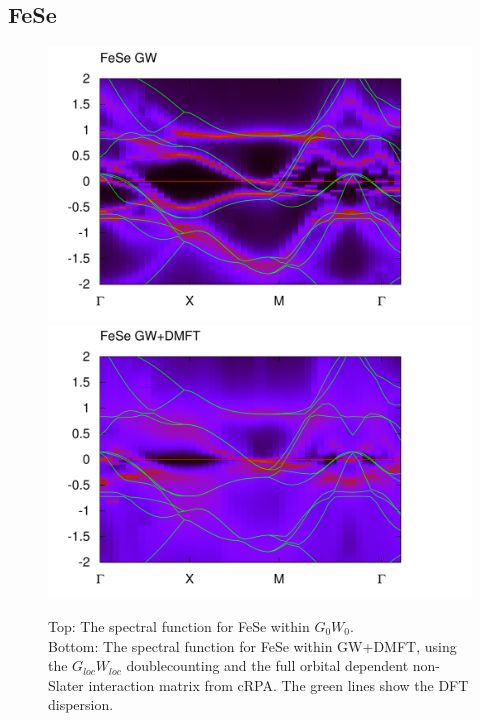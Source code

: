 \documentclass[12pt,a4paper]{scrartcl}
\numberwithin{equation}{section}
\begin{document}
\clearpage





\subsection{FeSe}
\begin{figure}[h]
\includegraphics[width=1\textwidth]{figs/results/FeSe_bands_GW.pdf} 
\includegraphics[width=1\textwidth]{figs/results/FeSe_bands_GWDMFT.pdf} 

\vspace*{-0.5cm}
\caption{Top: The spectral function for FeSe within $G_0W_0$.\\
Bottom: The spectral function for FeSe within GW+DMFT,
using the $G_{loc}W_{loc}$ doublecounting and the full orbital dependent 
non-Slater interaction matrix from cRPA. The green lines show the DFT dispersion.
}
\label{fig:results_BS_fese}
\end{figure}
\end{document}
